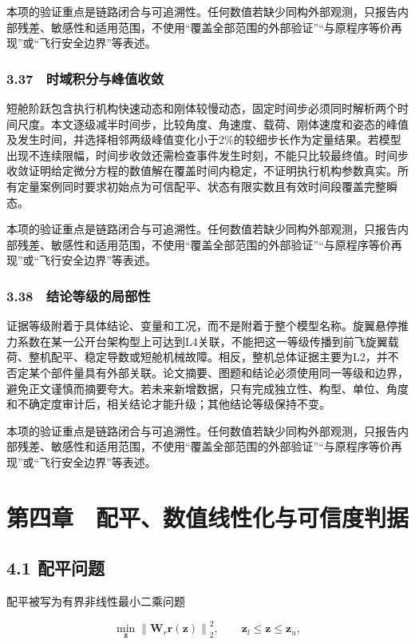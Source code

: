 \documentclass[UTF8,12pt,openany]{ctexbook}
\begin{document}
本项的验证重点是链路闭合与可追溯性。任何数值若缺少同构外部观测，只报告内部残差、敏感性和适用范围，不使用“覆盖全部范围的外部验证”“与原程序等价再现”或“飞行安全边界”等表述。

\subsection{3.37　时域积分与峰值收敛}

短舱阶跃包含执行机构快速动态和刚体较慢动态，固定时间步必须同时解析两个时间尺度。本文逐级减半时间步，比较角度、角速度、载荷、刚体速度和姿态的峰值及发生时间，并选择相邻两级峰值变化小于2\%的较细步长作为定量结果。若模型出现不连续限幅，时间步收敛还需检查事件发生时刻，不能只比较最终值。时间步收敛证明给定微分方程的数值解在覆盖时间内稳定，不证明执行机构参数真实。所有定量案例同时要求初始点为可信配平、状态有限实数且有效时间段覆盖完整瞬态。

本项的验证重点是链路闭合与可追溯性。任何数值若缺少同构外部观测，只报告内部残差、敏感性和适用范围，不使用“覆盖全部范围的外部验证”“与原程序等价再现”或“飞行安全边界”等表述。

\subsection{3.38　结论等级的局部性}

证据等级附着于具体结论、变量和工况，而不是附着于整个模型名称。旋翼悬停推力系数在某一公开台架构型上可达到L4关联，不能把这一等级传播到前飞旋翼载荷、整机配平、稳定导数或短舱机械故障。相反，整机总体证据主要为L2，并不否定某个部件量具有外部关联。论文摘要、图题和结论必须使用同一等级和边界，避免正文谨慎而摘要夸大。若未来新增数据，只有完成独立性、构型、单位、角度和不确定度审计后，相关结论才能升级；其他结论等级保持不变。

本项的验证重点是链路闭合与可追溯性。任何数值若缺少同构外部观测，只报告内部残差、敏感性和适用范围，不使用“覆盖全部范围的外部验证”“与原程序等价再现”或“飞行安全边界”等表述。

\chapter{第四章　配平、数值线性化与可信度判据}

\section{4.1 配平问题}

配平被写为有界非线性最小二乘问题

$$\min_{\mathbf{z}}\left\|\mathbf{W}_r\mathbf{r}(\mathbf{z})\right\|_2^2,
\qquad \mathbf{z}_l\leq\mathbf{z}\leq\mathbf{z}_u,$$
\end{document}
